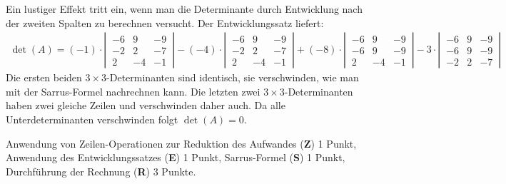 \begin{loesung}
Ein lustiger Effekt tritt ein, wenn man die Determinante durch Entwicklung
nach der zweiten Spalten zu berechnen versucht.
Der Entwicklungssatz liefert:
\begin{align*}
\det(A)
=(-1)\cdot
\left|\,\begin{matrix}
-6& 9&-9\\
-2& 2&-7\\
 2&-4&-1
\end{matrix}\,\right|
-(-4)\cdot
\left|\,\begin{matrix}
-6& 9&-9\\
-2& 2&-7\\
 2&-4&-1
\end{matrix}\,\right|
+(-8)\cdot
\left|\,\begin{matrix}
-6& 9&-9\\
-6& 9&-9\\
 2&-4&-1
\end{matrix}\,\right|
-3\cdot
\left|\,\begin{matrix}
-6& 9&-9\\
-6& 9&-9\\
-2& 2&-7
\end{matrix}\,\right|
\end{align*}
Die ersten beiden $3\times 3$-Determinanten sind identisch, sie verschwinden,
wie man mit der Sarrus-Formel nachrechnen kann.
Die letzten zwei $3\times 3$-Determinanten haben zwei gleiche Zeilen und
verschwinden daher auch.
Da alle Unterdeterminanten verschwinden folgt $\det(A)=0$.
\end{loesung}

\begin{bewertung}
Anwendung von Zeilen-Operationen zur Reduktion des Aufwandes
({\bf Z}) 1 Punkt, Anwendung des Entwicklungssatzes ({\bf E}) 1 Punkt,
Sarrus-Formel ({\bf S}) 1 Punkt, Durchführung der Rechnung ({\bf R})
3 Punkte.
\end{bewertung}

